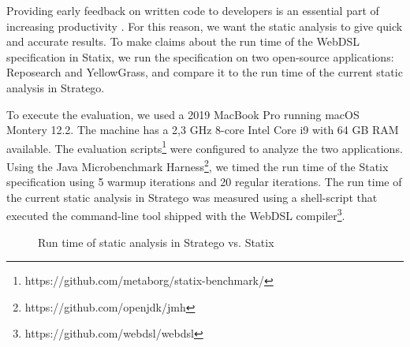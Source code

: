     Providing early feedback on written code to developers is an essential part of increasing productivity \autocite{Becker2019}. For this reason, we want the static analysis to give quick and accurate results. To make claims about the run time of the WebDSL specification in Statix, we run the specification on two open-source applications: Reposearch and YellowGrass, and compare it to the run time of the current static analysis in Stratego.

    To execute the evaluation, we used a 2019 MacBook Pro running macOS Montery 12.2. The machine has a 2,3 GHz 8-core Intel Core i9 with 64 GB RAM available. The evaluation scripts\footnote{https://github.com/metaborg/statix-benchmark/} were configured to analyze the two applications. Using the Java Microbenchmark Harness\footnote{https://github.com/openjdk/jmh}, we timed the run time of the Statix specification using 5 warmup iterations and 20 regular iterations. The run time of the current static analysis in Stratego was measured using a shell-script that executed the command-line tool shipped with the WebDSL compiler\footnote{https://github.com/webdsl/webdsl}.

    \begin{figure}
      \analysisbenchmarkresults
      \caption{\label{fig:analysis-performance-charts}Run time of static analysis in Stratego vs. Statix}
    \end{figure}

